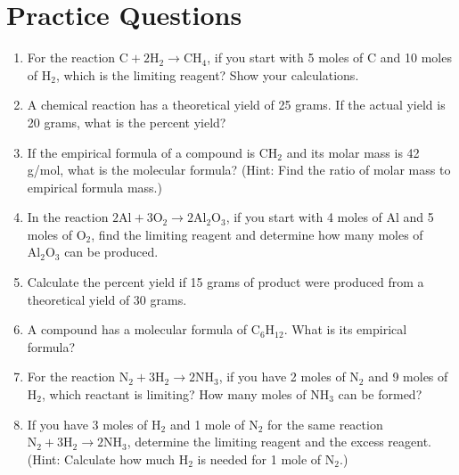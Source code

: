 \documentclass{article}
\begin{document}
\section*{Practice Questions}
\begin{enumerate}
    \item For the reaction \( \text{C} + 2\text{H}_2 \rightarrow \text{CH}_4 \), if you start with 5 moles of C and 10 moles of \(\text{H}_2\), which is the limiting reagent? Show your calculations.
    
    \item A chemical reaction has a theoretical yield of 25 grams. If the actual yield is 20 grams, what is the percent yield?

    \item If the empirical formula of a compound is \(\text{CH}_2\) and its molar mass is 42 g/mol, what is the molecular formula? (Hint: Find the ratio of molar mass to empirical formula mass.)

    \item In the reaction \( \text{2Al} + 3\text{O}_2 \rightarrow 2\text{Al}_2\text{O}_3 \), if you start with 4 moles of Al and 5 moles of \(\text{O}_2\), find the limiting reagent and determine how many moles of \(\text{Al}_2\text{O}_3\) can be produced.

    \item Calculate the percent yield if 15 grams of product were produced from a theoretical yield of 30 grams.

    \item A compound has a molecular formula of \(\text{C}_6\text{H}_{12}\). What is its empirical formula? 

    \item For the reaction \( \text{N}_2 + 3\text{H}_2 \rightarrow 2\text{NH}_3 \), if you have 2 moles of \(\text{N}_2\) and 9 moles of \(\text{H}_2\), which reactant is limiting? How many moles of \(\text{NH}_3\) can be formed?

    \item If you have 3 moles of \(\text{H}_2\) and 1 mole of \(\text{N}_2\) for the same reaction \( \text{N}_2 + 3\text{H}_2 \rightarrow 2\text{NH}_3 \), determine the limiting reagent and the excess reagent. (Hint: Calculate how much \(\text{H}_2\) is needed for 1 mole of \(\text{N}_2\).)
\end{enumerate}
\end{document}
